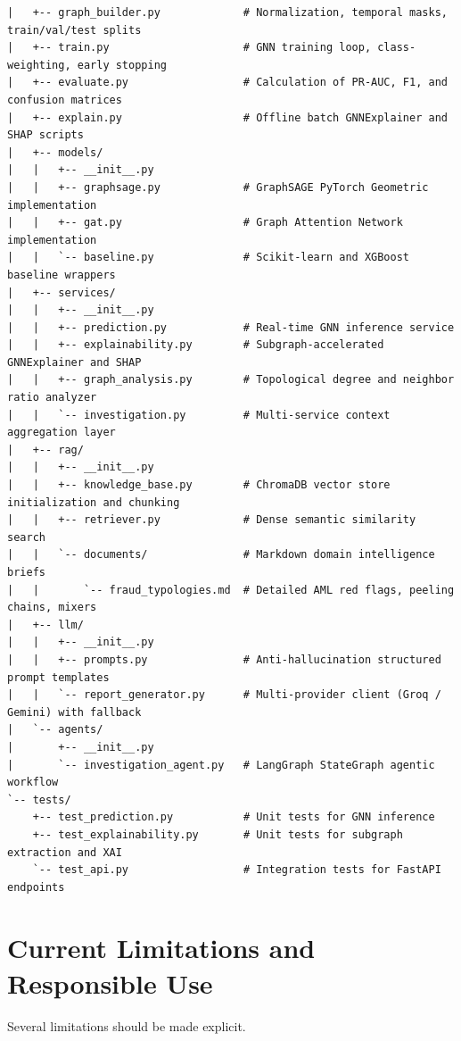 \documentclass[11pt,a4paper]{report}
\begin{document}
\begin{lstlisting}
|   +-- graph_builder.py             # Normalization, temporal masks, train/val/test splits
|   +-- train.py                     # GNN training loop, class-weighting, early stopping
|   +-- evaluate.py                  # Calculation of PR-AUC, F1, and confusion matrices
|   +-- explain.py                   # Offline batch GNNExplainer and SHAP scripts
|   +-- models/
|   |   +-- __init__.py
|   |   +-- graphsage.py             # GraphSAGE PyTorch Geometric implementation
|   |   +-- gat.py                   # Graph Attention Network implementation
|   |   `-- baseline.py              # Scikit-learn and XGBoost baseline wrappers
|   +-- services/
|   |   +-- __init__.py
|   |   +-- prediction.py            # Real-time GNN inference service
|   |   +-- explainability.py        # Subgraph-accelerated GNNExplainer and SHAP
|   |   +-- graph_analysis.py        # Topological degree and neighbor ratio analyzer
|   |   `-- investigation.py         # Multi-service context aggregation layer
|   +-- rag/
|   |   +-- __init__.py
|   |   +-- knowledge_base.py        # ChromaDB vector store initialization and chunking
|   |   +-- retriever.py             # Dense semantic similarity search
|   |   `-- documents/               # Markdown domain intelligence briefs
|   |       `-- fraud_typologies.md  # Detailed AML red flags, peeling chains, mixers
|   +-- llm/
|   |   +-- __init__.py
|   |   +-- prompts.py               # Anti-hallucination structured prompt templates
|   |   `-- report_generator.py      # Multi-provider client (Groq / Gemini) with fallback
|   `-- agents/
|       +-- __init__.py
|       `-- investigation_agent.py   # LangGraph StateGraph agentic workflow
`-- tests/
    +-- test_prediction.py           # Unit tests for GNN inference
    +-- test_explainability.py       # Unit tests for subgraph extraction and XAI
    `-- test_api.py                  # Integration tests for FastAPI endpoints
\end{lstlisting}


\section{Current Limitations and Responsible Use}

Several limitations should be made explicit.
\end{document}
